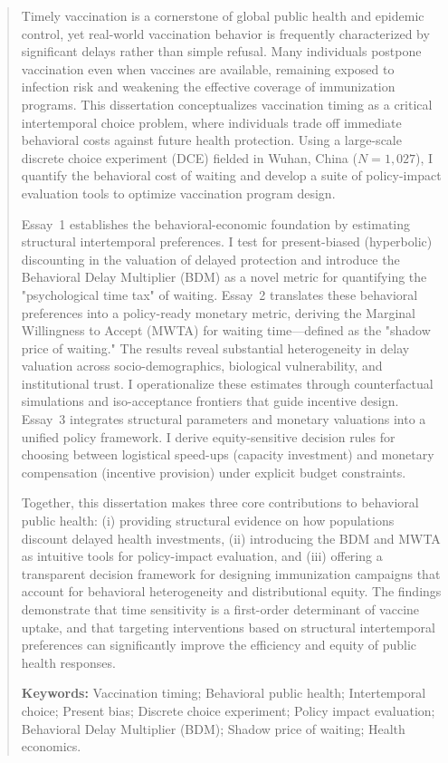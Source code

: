 \documentclass[doublespacing]{utdthesis}
\begin{document}
\begin{abstract}
Timely vaccination is a cornerstone of global public health and epidemic control, yet real-world vaccination behavior is frequently characterized by significant delays rather than simple refusal. Many individuals postpone vaccination even when vaccines are available, remaining exposed to infection risk and weakening the effective coverage of immunization programs. This dissertation conceptualizes vaccination timing as a critical intertemporal choice problem, where individuals trade off immediate behavioral costs against future health protection. Using a large-scale discrete choice experiment (DCE) fielded in Wuhan, China ($N=1,027$), I quantify the behavioral cost of waiting and develop a suite of policy-impact evaluation tools to optimize vaccination program design.

Essay~1 establishes the behavioral-economic foundation by estimating structural intertemporal preferences. I test for present-biased (hyperbolic) discounting in the valuation of delayed protection and introduce the Behavioral Delay Multiplier (BDM) as a novel metric for quantifying the "psychological time tax" of waiting. Essay~2 translates these behavioral preferences into a policy-ready monetary metric, deriving the Marginal Willingness to Accept (MWTA) for waiting time—defined as the "shadow price of waiting." The results reveal substantial heterogeneity in delay valuation across socio-demographics, biological vulnerability, and institutional trust. I operationalize these estimates through counterfactual simulations and iso-acceptance frontiers that guide incentive design. Essay~3 integrates structural parameters and monetary valuations into a unified policy framework. I derive equity-sensitive decision rules for choosing between logistical speed-ups (capacity investment) and monetary compensation (incentive provision) under explicit budget constraints.

Together, this dissertation makes three core contributions to behavioral public health: (i) providing structural evidence on how populations discount delayed health investments, (ii) introducing the BDM and MWTA as intuitive tools for policy-impact evaluation, and (iii) offering a transparent decision framework for designing immunization campaigns that account for behavioral heterogeneity and distributional equity. The findings demonstrate that time sensitivity is a first-order determinant of vaccine uptake, and that targeting interventions based on structural intertemporal preferences can significantly improve the efficiency and equity of public health responses.

\bigskip
\noindent\textbf{Keywords:} Vaccination timing; Behavioral public health; Intertemporal choice; Present bias; Discrete choice experiment; Policy impact evaluation; Behavioral Delay Multiplier (BDM); Shadow price of waiting; Health economics.
\end{abstract}
\end{document}
